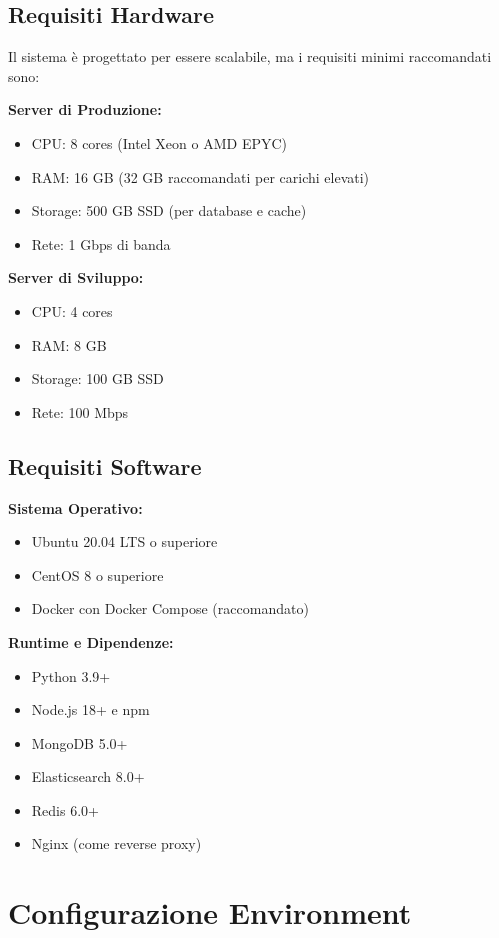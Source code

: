 \documentclass[12pt,a4paper]{report}
\begin{document}
\subsection{Requisiti Hardware}

Il sistema è progettato per essere scalabile, ma i requisiti minimi raccomandati sono:

\textbf{Server di Produzione:}
\begin{itemize}
    \item CPU: 8 cores (Intel Xeon o AMD EPYC)
    \item RAM: 16 GB (32 GB raccomandati per carichi elevati)
    \item Storage: 500 GB SSD (per database e cache)
    \item Rete: 1 Gbps di banda
\end{itemize}

\textbf{Server di Sviluppo:}
\begin{itemize}
    \item CPU: 4 cores
    \item RAM: 8 GB
    \item Storage: 100 GB SSD
    \item Rete: 100 Mbps
\end{itemize}

\subsection{Requisiti Software}

\textbf{Sistema Operativo:}
\begin{itemize}
    \item Ubuntu 20.04 LTS o superiore
    \item CentOS 8 o superiore
    \item Docker con Docker Compose (raccomandato)
\end{itemize}

\textbf{Runtime e Dipendenze:}
\begin{itemize}
    \item Python 3.9+
    \item Node.js 18+ e npm
    \item MongoDB 5.0+
    \item Elasticsearch 8.0+
    \item Redis 6.0+
    \item Nginx (come reverse proxy)
\end{itemize}

\section{Configurazione Environment}
\end{document}
